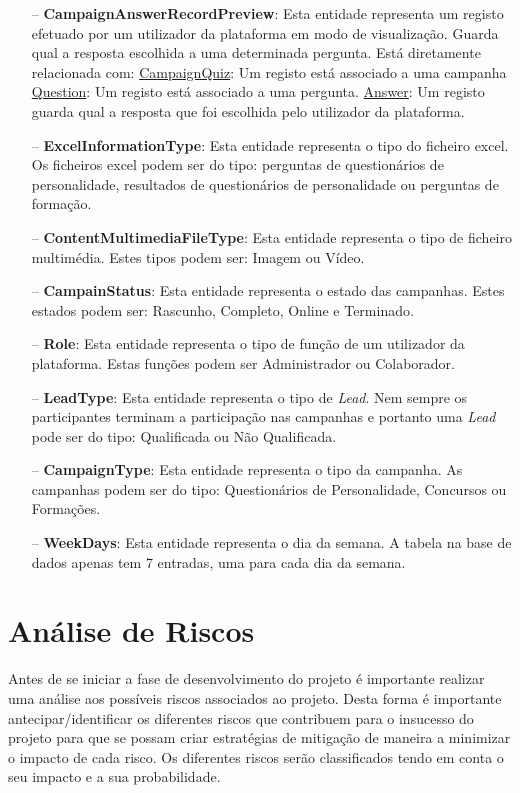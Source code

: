 \begin{itemize}
	\item[--] \textbf{CampaignAnswerRecordPreview}: Esta entidade representa um registo efetuado por um utilizador da plataforma em modo de visualização. Guarda qual a resposta escolhida a uma determinada pergunta. Está diretamente relacionada com:
	\subitem \underline{CampaignQuiz}: Um registo está associado a uma campanha
	\subitem \underline{Question}: Um registo está associado a uma pergunta.
	\subitem \underline{Answer}: Um registo guarda qual a resposta que foi escolhida pelo utilizador da plataforma.
	\item[--] \textbf{ExcelInformationType}: Esta entidade representa o tipo do ficheiro excel. Os ficheiros excel podem ser do tipo: perguntas de questionários de personalidade, resultados de questionários de personalidade ou perguntas de formação.
	\item[--] \textbf{ContentMultimediaFileType}: Esta entidade representa o tipo de ficheiro multimédia. Estes tipos podem ser:  Imagem ou Vídeo.
	\item[--] \textbf{CampainStatus}: Esta entidade representa o estado das campanhas. Estes estados podem ser: Rascunho, Completo, Online e Terminado.
	\item[--] \textbf{Role}: Esta entidade representa o tipo de função de um utilizador da plataforma. Estas funções podem ser Administrador ou Colaborador.
	\item[--] \textbf{LeadType}: Esta entidade representa o tipo de \textit{Lead}. Nem sempre os participantes terminam a participação nas campanhas e portanto uma \textit{Lead} pode ser do tipo: Qualificada ou Não Qualificada.
	\item[--] \textbf{CampaignType}: Esta entidade representa o tipo da campanha. As campanhas podem ser do tipo: Questionários de Personalidade, Concursos ou Formações. 
	\item[--] \textbf{WeekDays}: Esta entidade representa o dia da semana. A tabela na base de dados apenas tem 7 entradas, uma para cada dia da semana.
\end{itemize}



\section{Análise de Riscos}
\label{analiseriscos}

Antes de se iniciar a fase de desenvolvimento do projeto é importante realizar uma análise aos possíveis riscos associados ao projeto. Desta forma é importante antecipar/identificar os diferentes riscos que contribuem para o insucesso do projeto para que se possam criar estratégias de mitigação de maneira a minimizar o impacto de cada risco. Os diferentes riscos serão classificados tendo em conta o seu impacto e a sua probabilidade.

